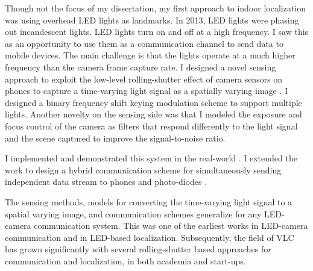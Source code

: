 \documentclass[10pt]{article}
\begin{document}
Though not the focus of my dissertation, my first approach to indoor localization was using overhead LED lights as landmarks. In 2013, LED lights were phasing out incandescent lights. 
LED lights turn on and off at a high frequency. I saw this as an opportunity to use them as a communication channel to send data to mobile devices. The main challenge is that the lights operate at a much higher frequency than the camera frame capture rate. %
I designed a novel sensing approach to exploit the low-level rolling-shutter effect of camera sensors on phones to capture a time-varying light signal as a spatially varying image \cite{rajagopal2014visual, rajagopal2014demonstration}. %
I designed a binary frequency shift keying modulation scheme to support multiple lights.  
Another novelty on the sensing side was that I modeled the exposure and focus control of the camera as
filters that respond differently to the light signal and the scene
captured to improve the signal-to-noise ratio.

I implemented and demonstrated this system in the real-world \cite{rajagopal2014demonstration}. I extended the work to design a hybrid communication scheme %
for simultaneously sending independent data stream to phones and photo-diodes \cite{rajagopal2014hybrid}. 

The sensing methods, models for converting the time-varying light signal to a spatial varying image, and communication schemes generalize for any LED-camera communication system. This was one of the earliest works in LED-camera communication and in LED-based localization. Subsequently, the field of VLC has grown significantly with several rolling-shutter based
approaches for communication and localization, in both academia and
start-ups.
\end{document}
